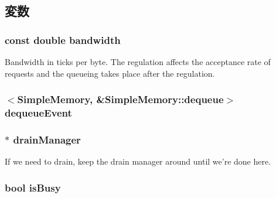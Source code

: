 \subsection{変数}
\hypertarget{classSimpleMemory_a18386495a208eab463cafbccfc28d5f4}{
\subsubsection[{bandwidth}]{\setlength{\rightskip}{0pt plus 5cm}const double {\bf bandwidth}}}
\label{classSimpleMemory_a18386495a208eab463cafbccfc28d5f4}
Bandwidth in ticks per byte. The regulation affects the acceptance rate of requests and the queueing takes place after the regulation. \hypertarget{classSimpleMemory_a8c2927c28d324098f4c7bb9b4d96bca1}{
\subsubsection[{dequeueEvent}]{$<${\bf SimpleMemory}, \&SimpleMemory::dequeue$>$ {\bf dequeueEvent}}}
\label{classSimpleMemory_a8c2927c28d324098f4c7bb9b4d96bca1}
\hypertarget{classSimpleMemory_a329b71fb934a93312ca0aacbf5a3f982}{
\subsubsection[{drainManager}]{$\ast$ {\bf drainManager}}}
\label{classSimpleMemory_a329b71fb934a93312ca0aacbf5a3f982}
If we need to drain, keep the drain manager around until we're done here. \hypertarget{classSimpleMemory_a099f725f22a344e190121634f53328d8}{
\subsubsection[{isBusy}]{\setlength{\rightskip}{0pt plus 5cm}bool {\bf isBusy}}}

